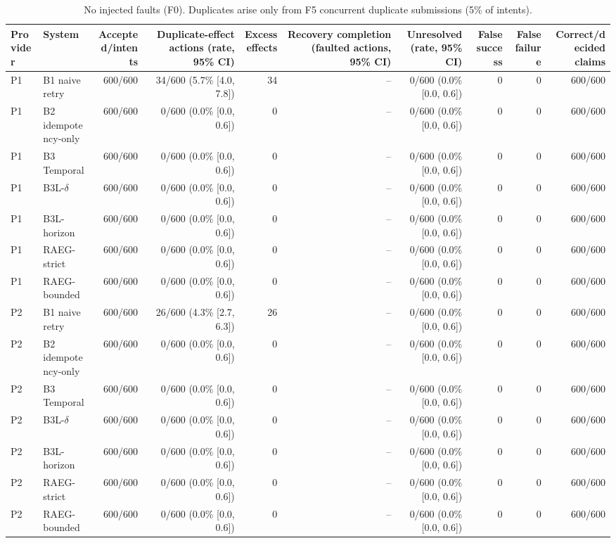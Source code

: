\begin{table}[t]
\centering
\scriptsize
\caption{No injected faults (F0). Duplicates arise only from F5 concurrent duplicate submissions (5\% of intents).}
\label{tab:m7-f0}
\begin{tabular}{llrrrrrrrr}
\toprule
Provider & System & Accepted/intents & Duplicate-effect actions (rate, 95\% CI) & Excess effects & Recovery completion (faulted actions, 95\% CI) & Unresolved (rate, 95\% CI) & False success & False failure & Correct/decided claims \\
\midrule
P1 & B1 naive retry & 600/600 & 34/600 (5.7\% [4.0, 7.8]) & 34 & -- & 0/600 (0.0\% [0.0, 0.6]) & 0 & 0 & 600/600 \\
P1 & B2 idempotency-only & 600/600 & 0/600 (0.0\% [0.0, 0.6]) & 0 & -- & 0/600 (0.0\% [0.0, 0.6]) & 0 & 0 & 600/600 \\
P1 & B3 Temporal & 600/600 & 0/600 (0.0\% [0.0, 0.6]) & 0 & -- & 0/600 (0.0\% [0.0, 0.6]) & 0 & 0 & 600/600 \\
P1 & B3L-$\delta$ & 600/600 & 0/600 (0.0\% [0.0, 0.6]) & 0 & -- & 0/600 (0.0\% [0.0, 0.6]) & 0 & 0 & 600/600 \\
P1 & B3L-horizon & 600/600 & 0/600 (0.0\% [0.0, 0.6]) & 0 & -- & 0/600 (0.0\% [0.0, 0.6]) & 0 & 0 & 600/600 \\
P1 & RAEG-strict & 600/600 & 0/600 (0.0\% [0.0, 0.6]) & 0 & -- & 0/600 (0.0\% [0.0, 0.6]) & 0 & 0 & 600/600 \\
P1 & RAEG-bounded & 600/600 & 0/600 (0.0\% [0.0, 0.6]) & 0 & -- & 0/600 (0.0\% [0.0, 0.6]) & 0 & 0 & 600/600 \\
P2 & B1 naive retry & 600/600 & 26/600 (4.3\% [2.7, 6.3]) & 26 & -- & 0/600 (0.0\% [0.0, 0.6]) & 0 & 0 & 600/600 \\
P2 & B2 idempotency-only & 600/600 & 0/600 (0.0\% [0.0, 0.6]) & 0 & -- & 0/600 (0.0\% [0.0, 0.6]) & 0 & 0 & 600/600 \\
P2 & B3 Temporal & 600/600 & 0/600 (0.0\% [0.0, 0.6]) & 0 & -- & 0/600 (0.0\% [0.0, 0.6]) & 0 & 0 & 600/600 \\
P2 & B3L-$\delta$ & 600/600 & 0/600 (0.0\% [0.0, 0.6]) & 0 & -- & 0/600 (0.0\% [0.0, 0.6]) & 0 & 0 & 600/600 \\
P2 & B3L-horizon & 600/600 & 0/600 (0.0\% [0.0, 0.6]) & 0 & -- & 0/600 (0.0\% [0.0, 0.6]) & 0 & 0 & 600/600 \\
P2 & RAEG-strict & 600/600 & 0/600 (0.0\% [0.0, 0.6]) & 0 & -- & 0/600 (0.0\% [0.0, 0.6]) & 0 & 0 & 600/600 \\
P2 & RAEG-bounded & 600/600 & 0/600 (0.0\% [0.0, 0.6]) & 0 & -- & 0/600 (0.0\% [0.0, 0.6]) & 0 & 0 & 600/600 \\

\end{tabular}
\end{table}
